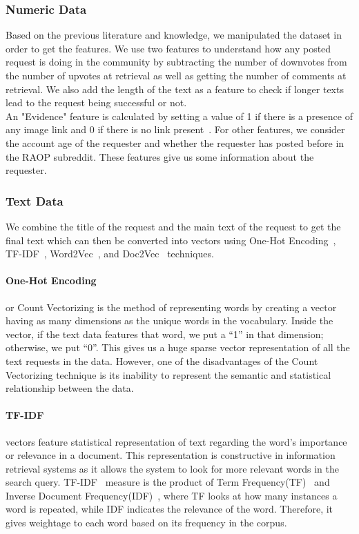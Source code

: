 \documentclass[runningheads]{llncs}
\begin{document}
\subsubsection{Numeric Data}
Based on the previous literature and knowledge, we manipulated the dataset in order to get the features. We use two features to understand how any posted request is doing in the community by subtracting the number of downvotes from the number of upvotes at retrieval as well as getting the number of comments at retrieval. We also add the length of the text as a feature to check if longer texts lead to the request being successful or not.\\
An "Evidence" feature is calculated by setting a value of 1 if there is a presence of any image link and 0 if there is no link present~\cite{raop_base}. For other features, we consider the account age of the requester and whether the requester has posted before in the RAOP subreddit. These features give us some information about the requester.

\subsubsection{Text Data}
We combine the title of the request and the main text of the request to get the final text which can then be converted into vectors using One-Hot Encoding~\cite{one_hot}, TF-IDF~\cite{tfidf}, Word2Vec~\cite{w2v}, and Doc2Vec~\cite{d2v} techniques.
\paragraph{One-Hot Encoding} or Count Vectorizing is the method of representing words by creating a vector having as many dimensions as the unique words in the vocabulary. Inside the vector, if the text data features that word, we put a “1” in that dimension; otherwise, we put “0”. This gives us a huge sparse vector representation of all the text requests in the data. However, one of the disadvantages of the Count Vectorizing technique is its inability to represent the semantic and statistical relationship between the data.
\paragraph{TF-IDF} vectors feature statistical representation of text regarding the word's importance or relevance in a document. This representation is constructive in information retrieval systems as it allows the system to look for more relevant words in the search query.
TF-IDF~\cite{tfidf} measure is the product of Term Frequency(TF)~\cite{tf} and Inverse Document Frequency(IDF)~\cite{idf}, where TF looks at how many instances a word is repeated, while IDF indicates the relevance of the word. Therefore, it gives weightage to each word based on its frequency in the corpus.
\end{document}
